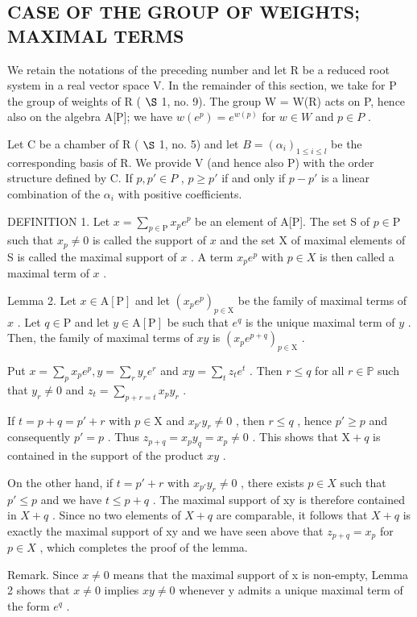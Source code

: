 \subsection{CASE OF THE GROUP OF WEIGHTS; MAXIMAL TERMS}

We retain the notations of the preceding number and let R be a reduced root system in a real vector space V. In the remainder of this section, we take for P the group of weights of R ( \(\S\) 1, no. 9). The group W = W(R) acts on P, hence also on the algebra A{[}P{]}; we have \(w(e^{p}) = e^{w(p)}\) for \(w \in W\) and \(p \in P\) .

Let C be a chamber of R ( \(\S\) 1, no. 5) and let \(B = (\alpha_{i})_{1 \leqslant i \leqslant l}\) be the corresponding basis of R. We provide V (and hence also P) with the order structure defined by C. If \(p, p' \in P\) , \(p \geqslant p'\) if and only if \(p - p'\) is a linear combination of the \(\alpha_{i}\) with positive coefficients.

DEFINITION 1. Let \(x = \sum_{p \in \mathrm{P}} x_p e^p\) be an element of A{[}P{]}. The set S of \(p \in \mathrm{P}\) such that \(x_p \neq 0\) is called the support of \(x\) and the set X of maximal elements of S is called the maximal support of \(x\) . A term \(x_p e^p\) with \(p \in X\) is then called a maximal term of \(x\) .

Lemma 2. Let \(x \in \mathrm{A}[\mathrm{P}]\) and let \((x_{p}e^{p})_{p \in \mathrm{X}}\) be the family of maximal terms of \(x\) . Let \(q \in \mathrm{P}\) and let \(y \in \mathrm{A}[\mathrm{P}]\) be such that \(e^{q}\) is the unique maximal term of \(y\) . Then, the family of maximal terms of \(xy\) is \((x_{p}e^{p + q})_{p \in \mathrm{X}}\) .

Put \(x = \sum_{p} x_{p} e^{p}, y = \sum_{r} y_{r} e^{r}\) and \(xy = \sum_{t} z_{t} e^{t}\) . Then \(r \leqslant q\) for all \(r \in \mathbb{P}\) such that \(y_{r} \neq 0\) and \(z_{t} = \sum_{p + r = t} x_{p} y_{r}\) .

If \(t = p + q = p' + r\) with \(p \in \mathrm{X}\) and \(x_{p'}y_r \neq 0\) , then \(r \leqslant q\) , hence \(p' \geqslant p\) and consequently \(p' = p\) . Thus \(z_{p + q} = x_p y_q = x_p \neq 0\) . This shows that \(\mathrm{X} + q\) is contained in the support of the product \(xy\) .

On the other hand, if \(t = p' + r\) with \(x_{p'} y_r \neq 0\) , there exists \(p \in X\) such that \(p' \leqslant p\) and we have \(t \leqslant p + q\) . The maximal support of xy is therefore contained in \(X + q\) . Since no two elements of \(X + q\) are comparable, it follows that \(X + q\) is exactly the maximal support of xy and we have seen above that \(z_{p+q} = x_p\) for \(p \in X\) , which completes the proof of the lemma.

Remark. Since \(x \neq 0\) means that the maximal support of x is non-empty, Lemma 2 shows that \(x \neq 0\) implies \(xy \neq 0\) whenever y admits a unique maximal term of the form \(e^{q}\) .

